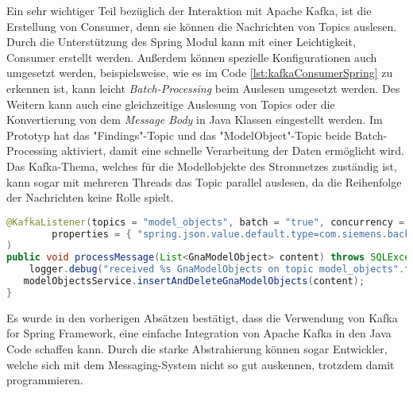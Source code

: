 Ein sehr wichtiger Teil bezüglich der Interaktion mit Apache Kafka, ist die Erstellung von Consumer, denn sie können die Nachrichten von Topics auslesen. Durch die Unterstützung des Spring Modul kann mit einer Leichtigkeit, Consumer erstellt werden. Außerdem können spezielle Konfigurationen auch umgesetzt werden, beispielsweise, wie es im Code \ref{lst:kafkaConsumerSpring} zu erkennen ist, kann leicht \emph{Batch-Processing} beim  Auslesen umgesetzt werden. Des Weitern kann auch eine gleichzeitige Auslesung von Topics oder die Konvertierung von dem \emph{Message Body} in Java Klassen eingestellt werden. Im Prototyp hat das "Findings"-Topic und das "ModelObject"-Topic beide Batch-Processing aktiviert, damit eine schnelle Verarbeitung der Daten ermöglicht wird. Das Kafka-Thema, welches für die Modellobjekte des Stromnetzes zuständig ist, kann sogar mit mehreren Threads das Topic parallel auslesen, da die Reihenfolge der Nachrichten keine Rolle spielt.

\begin{lstlisting}[language={java},caption={Definiton eines Consumers mithilfe von Kafka for Spring Framework },captionpos=b,label={lst:kafkaConsumerSpring}]
@KafkaListener(topics = "model_objects", batch = "true", concurrency = "3",
        properties = { "spring.json.value.default.type=com.siemens.backend.model.gna.GnaModelObject" }
)
public void processMessage(List<GnaModelObject> content) throws SQLException {
    logger.debug("received %s GnaModelObjects on topic model_objects".formatted(content.size()));
   modelObjectsService.insertAndDeleteGnaModelObjects(content);
}
\end{lstlisting}

Es wurde in den vorherigen Absätzen bestätigt, dass die Verwendung von Kafka for Spring Framework, eine einfache Integration von Apache Kafka in den Java Code schaffen kann. Durch die starke Abstrahierung können sogar Entwickler, welche sich mit dem Messaging-System nicht so gut auskennen, trotzdem damit programmieren.